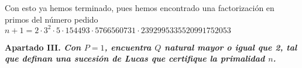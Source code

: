\documentclass[fleqn]{article}
\begin{document}
    Con esto ya hemos terminado, pues hemos encontrado una factorización en primos del número pedido 
    $n+1 = 2 \cdot 3^2 \cdot 5 \cdot 154493 \cdot 5766560731 \cdot 2392995335520991752053$

    




    \newpage
    \textbf{Apartado III. \textit{Con $P=1$, encuentra $Q$ natural mayor o igual que 2, tal que definan una sucesión de
            Lucas que certifique la primalidad $n$.}} \\
\end{document}
